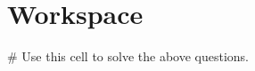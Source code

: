 \documentclass{ximera}
\begin{document}
\section{Workspace}

\begin{sageCell}
# Use this cell to solve the above questions.
\end{sageCell}
\end{document}
